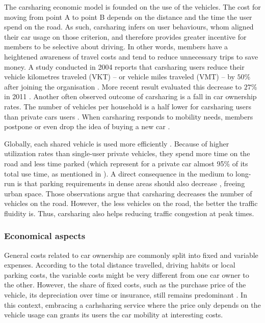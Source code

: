 The carsharing economic model is founded on the use of the vehicles.
The cost for moving from point A to point B depends on the distance and the time the user spend on the road.
As such, carsharing infers on user behaviours, whom aligned their car usage on those criterion, and therefore provides greater incentive for members to be selective about driving.
In other words, members have a heightened awareness of travel costs and tend to reduce unnecessary trips to save money.
A study conducted in 2004 reports that carsharing users reduce their vehicle kilometres traveled (VKT) -- or vehicle miles traveled (VMT) -- by $50$\% after joining the organisation \cite{cervero_city_2004}.
More recent result evaluated this decrease to $27$\% in 2011 \cite{martin_greenhouse_2011}.
Another often observed outcome of carsharing is a fall in car ownership rates.
The number of vehicles per household is a half lower for carsharing users than private cars users \cite{martin_impact_2010, ter_schure_cumulative_2012}.
When carsharing responds to mobility needs, members postpone or even drop the idea of buying a new car \cite{martin_impact_2010, sioui_carsharing_2013}.

\medskip
Globally, each shared vehicle is used more efficiently \cite{litman_evaluating_2000, schuster_assessing_2005}.
Because of higher utilization rates than single-user private vehicles, they spend more time on the road and less time parked (which represent for a private car almost 95\% of its total use time, as mentioned in \cite{transflash_2013}).
A direct consequence in the medium to long-run is that parking requirements in dense areas should also decrease \cite{mitchell_reinventing_2010}, freeing urban space.
Those observations argue that carsharing decreases the number of vehicles on the road.
However, the less vehicles on the road, the better the traffic fluidity is.
Thus, carsharing also helps reducing traffic congestion at peak times.


\subsubsection{Economical aspects}
General costs related to car ownership are commonly split into fixed and variable expenses.
According to the total distance travelled, driving habits or local parking costs, the variable costs might be very different from one car owner to the other.
However, the share of fixed costs, such as the purchase price of the vehicle, its depreciation over time or insurance, still remains predominant \cite{cout_reel_auto}.
In this context, embracing a carhsharing service where the price only depends on the vehicle usage can grants its users the car mobility at interesting costs.

